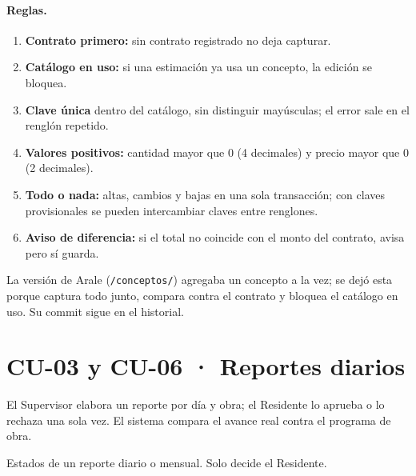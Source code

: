 \documentclass[11pt,letterpaper]{article}
\newcommand{\cod}[1]{\texttt{\small #1}}
\begin{document}
\paragraph{Reglas.}
\begin{enumerate}
  \item \textbf{Contrato primero:} sin contrato registrado no deja capturar.
  \item \textbf{Catálogo en uso:} si una estimación ya usa un concepto, la edición se bloquea.
  \item \textbf{Clave única} dentro del catálogo, sin distinguir mayúsculas; el error sale en el renglón repetido.
  \item \textbf{Valores positivos:} cantidad mayor que 0 (4 decimales) y precio mayor que 0 (2 decimales).
  \item \textbf{Todo o nada:} altas, cambios y bajas en una sola transacción; con claves provisionales se pueden intercambiar claves entre renglones.
  \item \textbf{Aviso de diferencia:} si el total no coincide con el monto del contrato, avisa pero sí guarda.
\end{enumerate}
La versión de Arale (\cod{/conceptos/}) agregaba un concepto a la vez; se dejó esta porque captura todo junto, compara contra el contrato y bloquea el catálogo en uso. Su commit sigue en el historial.

\section{CU-03 y CU-06 · Reportes diarios}
El Supervisor elabora un reporte por día y obra; el Residente lo aprueba o lo rechaza una sola vez. El sistema compara el avance real contra el programa de obra.

\begin{center}

{\small Estados de un reporte diario o mensual. Solo decide el Residente.}
\end{center}
\end{document}
